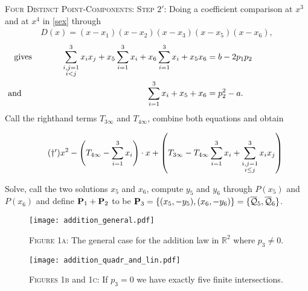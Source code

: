 \documentclass[english,11pt,a4paper]{article}
\begin{document}
\begin{case} {\scshape Four Distinct Point-Components:}
  {\scshape Step $2'$:} Doing a coefficient comparison at $x^3$ and at $x^4$ in \eqref{sex} through
  \begin{align*}\tag{$*_1'$}
    D(x) = (x-x_1)(x-x_2)(x-x_3)(x-x_5)(x-x_6),
  \end{align*}\vspace{-8mm}
  \begin{align*}
    \rlap{\hspace{-21mm} gives}
    \sum_{\substack{i,j=1\\i<j}}^3 x_i x_j + x_5\sum_{i=1}^3 x_i + x_6\sum_{i=1}^3 x_i + x_5 x_6 &= b-2p_1 p_2\\
    \rlap{\hspace{-59mm} and}
    \sum_{i=1}^3 x_i + x_5 + x_6 &= p_2^2-a.
  \end{align*}
  Call the righthand terms $T_{3\infty}$ and $T_{4\infty}$, combine both equations and obtain

  \vspace{-2mm}
  \fline
  \begin{align*}
    \label{daggerp} \tag{$\dagger '$} x^2 - \left( T_{4\infty} - \sumthr \right) \cdot x + \left(T_{3\infty} - T_{4\infty} \sumthr + \sum_{\substack{i,j=1\\i\leq j}}^3 x_i x_j \right)
  \end{align*}
  \fline

  Solve, call the two solutions $x_5$ and $x_6$, compute $y_5$ and $y_6$ through $P(x_5)$ and $P(x_6)$ and define $\P_1+\P_2$ to be $\P_3=\{ (x_5,-y_5) , (x_6,-y_6) \}=\{ \bar \q_5, \bar \q_6 \}$.
\end{case}


\begin{figure}[ht!]
  \fline
  \begin{center}
    \vspace{1mm}
    \texttt{[image: addition\_general.pdf]}

    {\scshape Figure 1a}: The general case for the addition law in $\mathds{R}^2$ where $p_3 \neq 0$.

    \vspace{1mm}

    \texttt{[image: addition\_quadr\_and\_lin.pdf]}

    {\scshape Figures 1b} and {\scshape 1c}: If $p_3 = 0$ we have exactly five finite intersections.
  \end{center}
  \vspace{-1.5mm}
  \fline
\end{figure}
\end{document}
